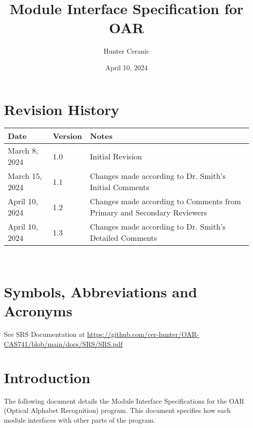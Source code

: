 \documentclass[12pt, titlepage]{article}
\begin{document}
\title{Module Interface Specification for OAR}

\author{Hunter Ceranic}

\date{April 10, 2024}

\maketitle


\section{Revision History}

\begin{tabularx}{\textwidth}{p{3cm}p{2cm}X}
\toprule {\bf Date} & {\bf Version} & {\bf Notes}\\
\midrule
March 8, 2024 & 1.0 & Initial Revision\\
March 15, 2024 & 1.1 & Changes made according to Dr. Smith's Initial Comments\\
April 10, 2024 & 1.2 & Changes made according to Comments from Primary and Secondary Reviewers\\
April 10, 2024 & 1.3 & Changes made according to Dr. Smith's Detailed Comments\\
\bottomrule
\end{tabularx}

~\newpage

\section{Symbols, Abbreviations and Acronyms}

See SRS Documentation \citep{SRS} at \url{https://github.com/cer-hunter/OAR-CAS741/blob/main/docs/SRS/SRS.pdf}

\newpage

\tableofcontents

\newpage


\section{Introduction}

The following document details the Module Interface Specifications for
the OAR (Optical Alphabet Recognition) program. This document specifies how each module
interfaces with other parts of the program.
\end{document}
